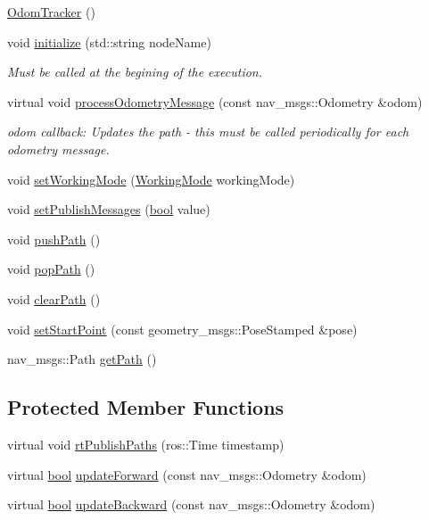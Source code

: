 \begin{DoxyCompactItemize}
\item 
\hyperlink{classodom__tracker_1_1OdomTracker_ab3be725f5690bfd0e663d57c1c636905}{Odom\+Tracker} ()
\item 
void \hyperlink{classodom__tracker_1_1OdomTracker_a4442b3d434ea81dcfeb22331f01d9db7}{initialize} (std\+::string node\+Name)
\begin{DoxyCompactList}\small\item\em Must be called at the begining of the execution. \end{DoxyCompactList}\item 
virtual void \hyperlink{classodom__tracker_1_1OdomTracker_a90cf5e7b0de712b88e86966c29ab79ef}{process\+Odometry\+Message} (const nav\+\_\+msgs\+::\+Odometry \&odom)
\begin{DoxyCompactList}\small\item\em odom callback\+: Updates the path -\/ this must be called periodically for each odometry message. \end{DoxyCompactList}\item 
void \hyperlink{classodom__tracker_1_1OdomTracker_ac001a40d1107ef0d88aa7db03cafb08c}{set\+Working\+Mode} (\hyperlink{namespaceodom__tracker_a4daf27fd157b1a481fdfd6f90de00b88}{Working\+Mode} working\+Mode)
\item 
void \hyperlink{classodom__tracker_1_1OdomTracker_abcfb8d68a75223ff1daba4930f4f7034}{set\+Publish\+Messages} (\hyperlink{classbool}{bool} value)
\item 
void \hyperlink{classodom__tracker_1_1OdomTracker_ad25596446295049cf67a6564aad0dfa0}{push\+Path} ()
\item 
void \hyperlink{classodom__tracker_1_1OdomTracker_aaba0160e172d1bb7989605852f19c658}{pop\+Path} ()
\item 
void \hyperlink{classodom__tracker_1_1OdomTracker_a03c47908606d48e20b3b7e7b583b341d}{clear\+Path} ()
\item 
void \hyperlink{classodom__tracker_1_1OdomTracker_ac927dff2231f73384e54d114d56e61e3}{set\+Start\+Point} (const geometry\+\_\+msgs\+::\+Pose\+Stamped \&pose)
\item 
nav\+\_\+msgs\+::\+Path \hyperlink{classodom__tracker_1_1OdomTracker_a33cb7ab3947b27bf61fabb5be2dd87c9}{get\+Path} ()
\end{DoxyCompactItemize}
\subsection*{Protected Member Functions}
\begin{DoxyCompactItemize}
\item 
virtual void \hyperlink{classodom__tracker_1_1OdomTracker_ade06ab05e1853fbccd3702f88f0a42e5}{rt\+Publish\+Paths} (ros\+::\+Time timestamp)
\item 
virtual \hyperlink{classbool}{bool} \hyperlink{classodom__tracker_1_1OdomTracker_a248c89552c36c6df65a0d3b9aa58cce6}{update\+Forward} (const nav\+\_\+msgs\+::\+Odometry \&odom)
\item 
virtual \hyperlink{classbool}{bool} \hyperlink{classodom__tracker_1_1OdomTracker_a30bb3d4a44600ce951a6be4f6583466c}{update\+Backward} (const nav\+\_\+msgs\+::\+Odometry \&odom)
\end{DoxyCompactItemize}

